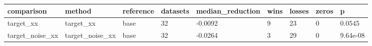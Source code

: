 \begin{tabular}{lllllllll}
\toprule
comparison & method & reference & datasets & median\_reduction & wins & losses & zeros & p \\
\midrule
target\_xx & target\_xx & base & 32 & -0.0092 & 9 & 23 & 0 & 0.0545 \\
target\_noise\_xx & target\_noise\_xx & base & 32 & -0.0264 & 3 & 29 & 0 & 9.64e-08 \\
\bottomrule
\end{tabular}
